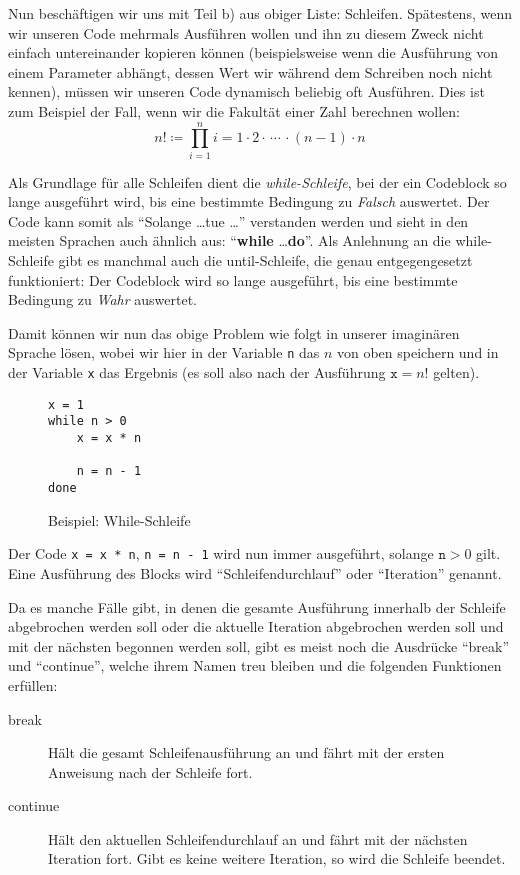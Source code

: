 	Nun beschäftigen wir uns mit Teil b) aus obiger Liste: Schleifen. Spätestens, wenn wir unseren Code mehrmals Ausführen wollen und ihn zu diesem Zweck nicht einfach untereinander kopieren können (beispielsweise wenn die Ausführung von einem Parameter abhängt, dessen Wert wir während dem Schreiben noch nicht kennen), müssen wir unseren Code dynamisch beliebig oft Ausführen. Dies ist zum Beispiel der Fall, wenn wir die Fakultät einer Zahl berechnen wollen: \[ n! \coloneqq \prod _ { i = 1 } ^ n i = 1 \cdot 2 \cdot\,\cdots\,\cdot (n - 1) \cdot n \]
	
	Als Grundlage für alle Schleifen dient die \textit{while-Schleife}, bei der ein Codeblock so lange ausgeführt wird, bis eine bestimmte Bedingung zu \textit{Falsch} auswertet. Der Code kann somit als \enquote{Solange \dots tue \dots} verstanden werden und sieht in den meisten Sprachen auch ähnlich aus: \enquote{\textbf{while} \dots \textbf{do}}. Als Anlehnung an die while-Schleife gibt es manchmal auch die until-Schleife, die genau entgegengesetzt funktioniert: Der Codeblock wird so lange ausgeführt, bis eine bestimmte Bedingung zu \textit{Wahr} auswertet.
	
	Damit können wir nun das obige Problem wie folgt in unserer imaginären Sprache lösen, wobei wir hier in der Variable \texttt{n} das \( n \) von oben speichern und in der Variable \texttt{x} das Ergebnis (es soll also nach der Ausführung $ \texttt{x} = n! $ gelten).
	\begin{figure}[H]
		\centering
		\begin{lstlisting}
x = 1
while n > 0
	x = x * n

	n = n - 1
done
		\end{lstlisting}
		\caption{Beispiel: While-Schleife}
	\end{figure}
	
	Der Code \texttt{x = x * n}, \texttt{n = n - 1} wird nun immer ausgeführt, solange \( \texttt{n} > 0 \) gilt. Eine Ausführung des Blocks wird \enquote{Schleifendurchlauf} oder \enquote{Iteration} genannt.
	
	Da es manche Fälle gibt, in denen die gesamte Ausführung innerhalb der Schleife abgebrochen werden soll oder die aktuelle Iteration abgebrochen werden soll und mit der nächsten begonnen werden soll, gibt es meist noch die Ausdrücke \enquote{break} und \enquote{continue}, welche ihrem Namen treu bleiben und die folgenden Funktionen erfüllen:
	\begin{description}
		\item[break] Hält die gesamt Schleifenausführung an und fährt mit der ersten Anweisung nach der Schleife fort.
		\item[continue] Hält den aktuellen Schleifendurchlauf an und fährt mit der nächsten Iteration fort. Gibt es keine weitere Iteration, so wird die Schleife beendet.
	\end{description}
